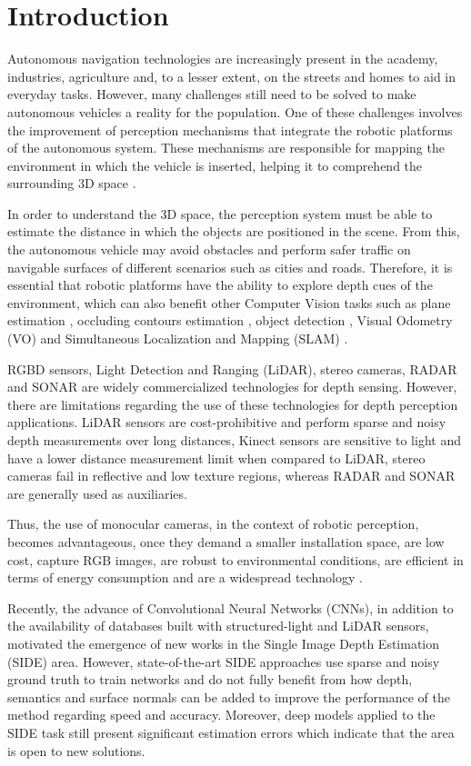 \documentclass[5p]{elsarticle}
\begin{document}
\section{Introduction}

Autonomous navigation technologies are increasingly present in the academy, industries, agriculture and, to a lesser extent, on the streets and homes to aid in everyday tasks. However, many challenges still need to be solved to make autonomous vehicles a reality for the population. One of these challenges involves the improvement of perception mechanisms that integrate the robotic platforms of the autonomous system. These mechanisms are responsible for mapping the environment in which the vehicle is inserted, helping it to comprehend the surrounding 3D space \cite{mancini2017toward}.

In order to understand the 3D space, the perception system must be able to estimate the distance in which the objects are positioned in the scene. From this, the autonomous vehicle may avoid obstacles and perform safer traffic on navigable surfaces of different scenarios such as cities and roads. Therefore, it is essential that robotic platforms have the ability to explore depth cues of the environment, which can also benefit other Computer Vision tasks such as plane estimation \cite{wang2016surge}, occluding contours estimation \cite{ramamonjisoa2019sharpnet}, object detection \cite{chang2019deep}, Visual Odometry (VO) \cite{loo2019cnn} and Simultaneous Localization and Mapping (SLAM) \cite{tateno2017cnn}.

RGBD sensors, Light Detection and Ranging (LiDAR), stereo cameras, RADAR and SONAR are widely commercialized technologies for depth sensing. However, there are limitations regarding the use of these technologies for depth perception applications. LiDAR sensors are cost-prohibitive and perform sparse and noisy depth measurements over long distances, Kinect sensors are sensitive to light and have a lower distance measurement limit when compared to LiDAR, stereo cameras fail in reflective and low texture regions, whereas RADAR and SONAR are generally used as auxiliaries. 

Thus, the use of monocular cameras, in the context of robotic perception, becomes advantageous, once they demand a smaller installation space, are low cost, capture RGB images, are robust to environmental conditions, are efficient in terms of energy consumption and are a widespread technology \cite{ma2018sparse}. 

Recently, the advance of Convolutional Neural Networks (CNNs), in addition to the availability of databases built with structured-light and LiDAR sensors, motivated the emergence of new works in the Single Image Depth Estimation (SIDE) area. However, state-of-the-art SIDE approaches use sparse and noisy ground truth to train networks and do not fully benefit from how depth, semantics and surface normals can be added to improve the performance of the method regarding speed and accuracy. Moreover, deep models applied to the SIDE task still present significant estimation errors which indicate that the area is open to new solutions.
\end{document}

